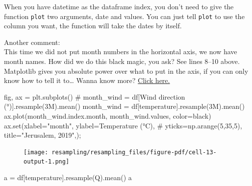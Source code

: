 \documentclass[
  letterpaper,
  DIV=11,
  numbers=noendperiod,
  oneside]{scrreprt}
\newenvironment{Shaded}{\begin{snugshade}}{\end{snugshade}}
\newcommand{\BuiltInTok}[1]{\textcolor[rgb]{0.00,0.23,0.31}{#1}}
\newcommand{\CommentTok}[1]{\textcolor[rgb]{0.37,0.37,0.37}{#1}}
\newcommand{\NormalTok}[1]{\textcolor[rgb]{0.00,0.23,0.31}{#1}}
\newcommand{\OperatorTok}[1]{\textcolor[rgb]{0.37,0.37,0.37}{#1}}
\newcommand{\StringTok}[1]{\textcolor[rgb]{0.13,0.47,0.30}{#1}}
\begin{document}
When you have datetime as the dataframe index, you don't need to give
the function \texttt{plot} two arguments, date and values. You can just
tell \texttt{plot} to use the column you want, the function will take
the dates by itself.

Another comment:\\
This time we did not put month numbers in the horizontal axis, we now
have month names. How did we do this black magic, you ask? See lines
8--10 above. Matplotlib gives you absolute power over what to put in the
axis, if you can only know how to tell it to\ldots{} Wanna know more?
\href{/best-practices/dates.qmd}{Click here.}

\begin{Shaded}
\begin{Highlighting}[]
\NormalTok{fig, ax }\OperatorTok{=}\NormalTok{ plt.subplots()}
\CommentTok{\# month\_wind = df[\textquotesingle{}Wind direction (°)\textquotesingle{}].resample(\textquotesingle{}3M\textquotesingle{}).mean()  }
\NormalTok{month\_wind }\OperatorTok{=}\NormalTok{ df[}\StringTok{\textquotesingle{}temperature\textquotesingle{}}\NormalTok{].resample(}\StringTok{\textquotesingle{}3M\textquotesingle{}}\NormalTok{).mean()  }
\NormalTok{ax.plot(month\_wind.index.month, month\_wind.values, color}\OperatorTok{=}\StringTok{\textquotesingle{}black\textquotesingle{}}\NormalTok{)}
\NormalTok{ax.}\BuiltInTok{set}\NormalTok{(xlabel}\OperatorTok{=}\StringTok{"month"}\NormalTok{,}
\NormalTok{       ylabel}\OperatorTok{=}\StringTok{\textquotesingle{}Temperature (°C)\textquotesingle{}}\NormalTok{,}
       \CommentTok{\# yticks=np.arange(5,35,5),}
\NormalTok{       title}\OperatorTok{=}\StringTok{"Jerusalem, 2019"}\NormalTok{,)}\OperatorTok{;}
\end{Highlighting}
\end{Shaded}

\begin{figure}[H]

{\centering \texttt{[image: resampling/resampling\_files/figure-pdf/cell-13-output-1.png]}

}

\end{figure}

\begin{Shaded}
\begin{Highlighting}[]
\NormalTok{a }\OperatorTok{=}\NormalTok{ df[}\StringTok{\textquotesingle{}temperature\textquotesingle{}}\NormalTok{].resample(}\StringTok{\textquotesingle{}Q\textquotesingle{}}\NormalTok{).mean()}
\NormalTok{a}
\end{Highlighting}
\end{Shaded}
\end{document}
